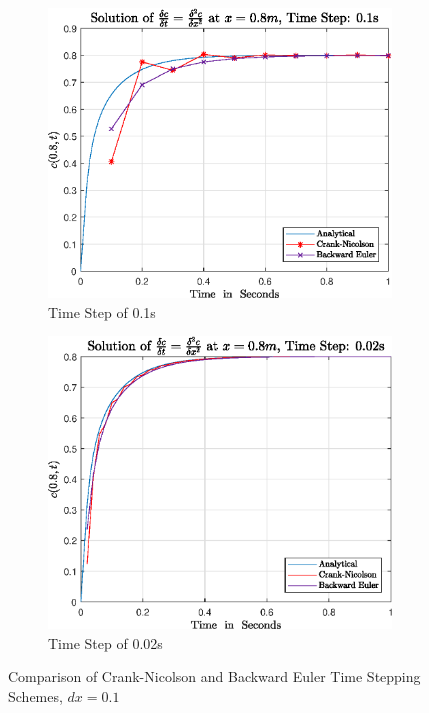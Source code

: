 \documentclass[11pt]{article}
\begin{document}
\begin{figure}[ht] 
        \centering
        \begin{subfigure}[b]{0.475\textwidth}
            \centering
            \includegraphics[width=\textwidth]{epsQ1bdt05}
            \caption[]%
            {{\small Time Step of 0.1s }}    
            \label{fig:q1b10}
        \end{subfigure}
        \hfill
        \begin{subfigure}[b]{0.475\textwidth}  
            \centering 
            \includegraphics[width=\textwidth]{epsQ1bdt025}
            \caption[]%
            {{\small Time Step of 0.02s}}    
            \label{fig:q1b025}
        \end{subfigure}
        \caption[ The Effect of Mesh Size on Temperature Resolution ]
        {\small Comparison of Crank-Nicolson and Backward Euler Time Stepping Schemes, $dx = 0.1$} 
        \label{fig:q1b025}
\end{figure}
\end{document}
